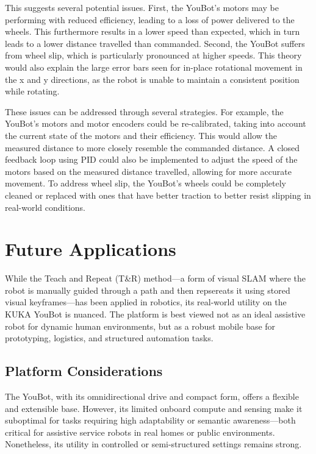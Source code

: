 \documentclass[a4paper, 12pt]{article}
\begin{document}
    This suggests several potential issues. First, the YouBot's motors may be performing with reduced efficiency, leading to a loss of power delivered to the wheels. This furthermore results in a lower speed than expected, which in turn leads to a lower distance travelled than commanded. Second, the YouBot suffers from wheel slip, which is particularly pronounced at higher speeds. This theory would also explain the large error bars seen for in-place rotational movement in the x and y directions, as the robot is unable to maintain a consistent position while rotating.

    These issues can be addressed through several strategies. For example, the YouBot's motors and motor encoders could be re-calibrated, taking into account the current state of the motors and their efficiency. This would allow the measured distance to more closely resemble the commanded distance. A closed feedback loop using PID could also be implemented to adjust the speed of the motors based on the measured distance travelled, allowing for more accurate movement. To address wheel slip, the YouBot's wheels could be completely cleaned or replaced with ones that have better traction to better resist slipping in real-world conditions. 

    \pagebreak

    \section{Future Applications}

    While the Teach and Repeat (T\&R) method---a form of visual SLAM where the robot is manually guided through a path and then repsereats it using stored visual keyframes---has been applied in robotics, its real-world utility on the KUKA YouBot is nuanced. The platform is best viewed not as an ideal assistive robot for dynamic human environments, but as a robust mobile base for prototyping, logistics, and structured automation tasks.

    \subsection{Platform Considerations}

    The YouBot, with its omnidirectional drive and compact form, offers a flexible and extensible base. However, its limited onboard compute and sensing make it suboptimal for tasks requiring high adaptability or semantic awareness---both critical for assistive service robots in real homes or public environments. Nonetheless, its utility in controlled or semi-structured settings remains strong.
\end{document}
